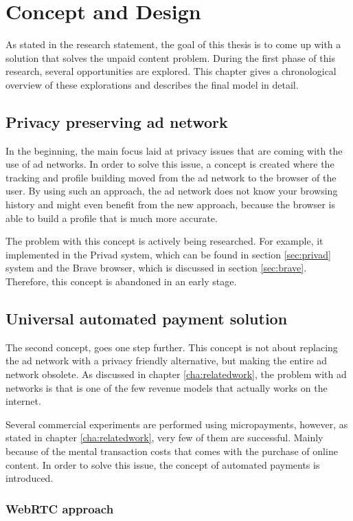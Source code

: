 \chapter{Concept and Design}
\label{cha:conceptanddesign}

As stated in the research statement, the goal of this thesis is to come up with a solution that solves the unpaid content problem. During the first phase of this research, several opportunities are explored. This chapter gives a chronological overview of these explorations and describes the final model in detail.

\section{Privacy preserving ad network}
In the beginning, the main focus laid at privacy issues that are coming with the use of ad networks. In order to solve this issue, a concept is created where the tracking and profile building moved from the ad network to the browser of the user. By using such an approach, the ad network does not know your browsing history and might even benefit from the new approach, because the browser is able to build a profile that is much more accurate. 

The problem with this concept is actively being researched. For example, it implemented in the Privad system, which can be found in section \ref{sec:privad} system and the Brave browser, which is discussed in section \ref{sec:brave}. Therefore, this concept is abandoned in an early stage.

\section{Universal automated payment solution}
The second concept, goes one step further. This concept is not about replacing the ad network with a privacy friendly alternative, but making the entire ad network obsolete. As discussed in chapter \ref{cha:relatedwork}, the problem with ad networks is that is one of the few revenue models that actually works on the internet.

Several commercial experiments are performed using micropayments, however, as stated in chapter \ref{cha:relatedwork}, very few of them are successful. Mainly because of the mental transaction costs that comes with the purchase of online content. In order to solve this issue, the concept of automated payments is introduced. 

\subsection{WebRTC approach}

